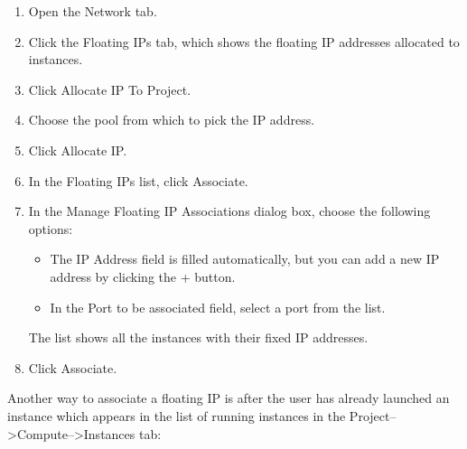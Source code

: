 {\begin{enumerate}
\item Open the Network tab.
\item Click the Floating IPs tab, which shows the floating IP
  addresses allocated to instances.
\item Click Allocate IP To Project.
\item Choose the pool from which to pick the IP address.
\item Click Allocate IP.
\item In the Floating IPs list, click Associate.
\item In the Manage Floating IP Associations dialog box, choose the
  following options:

  \begin{itemize}
  \item The IP Address field is filled automatically, but you can add
    a new IP address by clicking the + button.
  \item In the Port to be associated field, select a port from the
    list.
  \end{itemize}

  The list shows all the instances with their fixed IP addresses.
\item Click Associate.
\end{enumerate}

Another way to associate a floating IP is after the user has already launched an instance which appears in the list of running instances in the Project-->Compute-->Instances tab:

}
